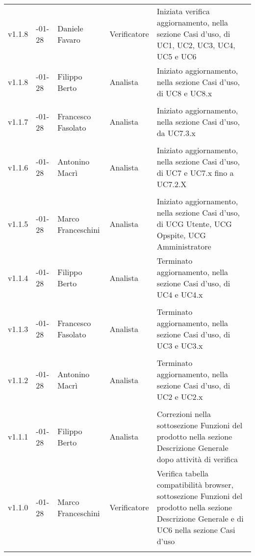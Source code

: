 \begin{longtable} { >{\centering}p{1.4cm} >{\centering}p{2cm} >{\centering}p{2.3cm} >{\centering}p{2.7cm} p{5.5cm} }
		v1.1.8 & 2017-01-28 & Daniele Favaro & Verificatore & Iniziata verifica aggiornamento, nella sezione Casi d'uso, di UC1, UC2, UC3, UC4, UC5 e UC6 \\
		\addlinespace[0.4em]
		\midrule
		\addlinespace[0.4em]
		v1.1.8 & 2017-01-28 & Filippo Berto & Analista & Iniziato aggiornamento, nella sezione Casi d'uso, di UC8 e UC8.x \\ \\
		\addlinespace[0.4em]
		\midrule
		\addlinespace[0.4em]
		v1.1.7 & 2017-01-28 & Francesco Fasolato & Analista & Iniziato aggiornamento, nella sezione Casi d'uso, da UC7.3.x\\ \\
		\addlinespace[0.4em]
		\midrule
		\addlinespace[0.4em]
		v1.1.6 & 2017-01-28 & Antonino Macrì & Analista & Iniziato aggiornamento, nella sezione Casi d'uso, di UC7 e UC7.x fino a UC7.2.X \\ \\
		\addlinespace[0.4em]
		\midrule
		\addlinespace[0.4em]
		v1.1.5 & 2017-01-28 & Marco Franceschini & Analista & Iniziato aggiornamento, nella sezione Casi d'uso, di UCG Utente, UCG Opspite, UCG Amministratore \\ 
		\addlinespace[0.4em]
		\midrule
		\addlinespace[0.4em]
		v1.1.4 & 2017-01-28 & Filippo Berto & Analista & Terminato aggiornamento, nella sezione Casi d'uso, di UC4 e UC4.x \\ \\
		\addlinespace[0.4em]
		\midrule
		\addlinespace[0.4em]
		v1.1.3 & 2017-01-28 & Francesco Fasolato & Analista & Terminato aggiornamento, nella sezione Casi d'uso, di UC3 e UC3.x \\ \\
		\addlinespace[0.4em]
		\midrule
		\addlinespace[0.4em]
		v1.1.2 & 2017-01-28 & Antonino Macrì & Analista & Terminato aggiornamento, nella sezione Casi d'uso, di UC2 e UC2.x \\ \\
		\addlinespace[0.4em]
		\midrule
		\addlinespace[0.4em]
		v1.1.1 & 2017-01-28 & Filippo Berto & Analista & Correzioni nella sottosezione Funzioni del prodotto nella sezione Descrizione Generale dopo attività di verifica \\ 
		\addlinespace[0.4em]
		\midrule
		\addlinespace[0.4em]
		v1.1.0 & 2017-01-28 & Marco Franceschini & Verificatore & Verifica tabella compatibilità browser, sottosezione Funzioni del prodotto nella sezione Descrizione Generale e di UC6 nella sezione Casi d'uso\\ 
		\addlinespace[0.4em]

\end{longtable}
